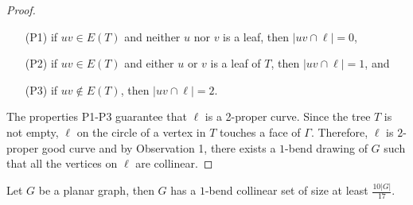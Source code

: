 \begin{proof}
    \begin{enumerate}
        \item [(P1)] if $uv \in E(T)$ and neither $u$ nor $v$ is a leaf, then $|uv \cap \ell| = 0$,
        
        \item [(P2)] if $uv \in E(T)$ and either $u$ or $v$ is a leaf of $T$, then $|uv \cap \ell| = 1$, and
        
        \item [(P3)] if $uv \notin E(T)$, then $|uv \cap \ell| = 2$.
    \end{enumerate}
    
    The properties P1-P3 guarantee that $\ell$ is a 2-proper curve. Since the tree $T$ is not empty, $\ell$ on the circle of a vertex in $T$ touches a face of $\Gamma$. Therefore, $\ell$ is $2$-proper good curve and by Observation 1, there exists a $1$-bend drawing of $G$ such that all the vertices on $\ell$ are collinear.

   
\end{proof}


\begin{thm}
    Let $G$ be a planar graph, then $G$ has a $1$-bend collinear set of size at least $\frac{10|G|}{17}$.
\end{thm}
